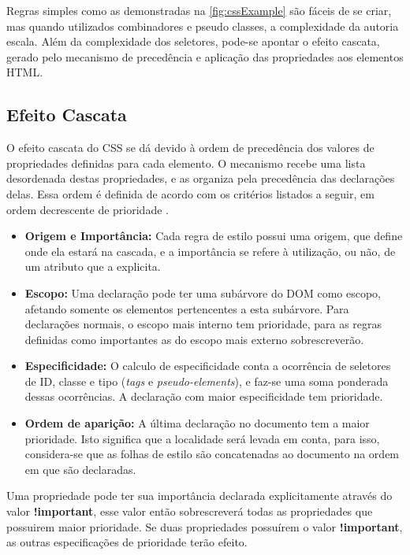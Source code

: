 Regras simples como as demonstradas na \autoref{fig:cssExample} são fáceis de se criar, mas quando utilizados combinadores e pseudo classes, a complexidade da autoria escala. Além da complexidade dos seletores, pode-se apontar o efeito cascata, gerado pelo mecanismo de precedência e aplicação das propriedades aos elementos HTML.

\subsection{Efeito Cascata}
\label{subsec:cascade}

O efeito cascata do CSS se dá devido à ordem de precedência dos valores de propriedades definidas para cada elemento. O mecanismo recebe uma lista desordenada destas propriedades, e as organiza pela precedência das declarações delas. Essa ordem é definida de acordo com os critérios listados a seguir, em ordem decrescente de prioridade \cite{CSScascade2015}.

\begin{itemize}
	\item \textbf{Origem e Importância:} 
	Cada regra de estilo possui uma origem, que define onde ela estará na cascada, e a importância se refere à utilização, ou não, de um atributo que a explicita.
	\item \textbf{Escopo:}
	Uma declaração pode ter uma subárvore do DOM como escopo, afetando somente os elementos pertencentes a esta subárvore. Para declarações normais, o escopo mais interno tem prioridade, para as regras definidas como importantes as do escopo mais externo sobrescreverão.
	\item \textbf{Especificidade:}
	O calculo de especificidade conta a ocorrência de seletores de ID, classe e tipo (\textit{tags} e \textit{pseudo-elements}), e faz-se uma soma ponderada dessas ocorrências. A declaração com maior especificidade tem prioridade.
	\item \textbf{Ordem de aparição:}
	A última declaração no documento tem a maior prioridade. Isto significa que a localidade será levada em conta, para isso, considera-se que as folhas de estilo são concatenadas ao documento na ordem em que são declaradas.
\end{itemize}

Uma propriedade pode ter sua importância declarada explicitamente através do valor \textbf{!important}, esse valor então sobrescreverá todas as propriedades que possuirem maior prioridade. Se duas propriedades possuírem o valor \textbf{!important}, as outras especificações de prioridade terão efeito.


